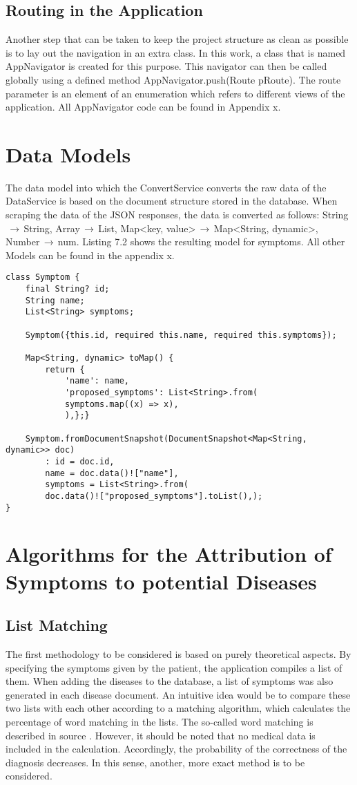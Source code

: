 \subsection{Routing in the Application}
Another step that can be taken to keep the project structure as clean as possible is to lay out the navigation in an extra class. In this work, a class that is named AppNavigator is created for this purpose. This navigator can then be called globally using a defined method AppNavigator.push(Route pRoute). The route parameter is an element of an enumeration which refers to different views of the application. All AppNavigator code can be found in Appendix x.
\section{Data Models}
The data model into which the ConvertService converts the raw data of the DataService is based on the document structure stored in the database. When scraping the data of the JSON responses, the data is converted as follows: String$\,\to\,$String, Array$\,\to\,$List, Map<key, value>$\,\to\,$Map<String, dynamic>, Number$\,\to\,$num. Listing 7.2 shows the resulting model for symptoms. All other Models can be found in the appendix x.
\scriptsize
\begin{lstlisting}[caption=Model for Symptoms]
class Symptom {
	final String? id;
	String name;
	List<String> symptoms;
	
	Symptom({this.id, required this.name, required this.symptoms});
	
	Map<String, dynamic> toMap() {
		return {
			'name': name,
			'proposed_symptoms': List<String>.from(
			symptoms.map((x) => x),
			),};}
	
	Symptom.fromDocumentSnapshot(DocumentSnapshot<Map<String, dynamic>> doc)
		: id = doc.id,
		name = doc.data()!["name"],
		symptoms = List<String>.from(
		doc.data()!["proposed_symptoms"].toList(),);	
}
\end{lstlisting}
\normalsize


\section{Algorithms for the Attribution of Symptoms to potential Diseases}
\subsection{List Matching}
The first methodology to be considered is based on purely theoretical aspects. By specifying the symptoms given by the patient, the application compiles a list of them. When adding the diseases to the database, a list of symptoms was also generated in each disease document. An intuitive idea would be to compare these two lists with each other according to a matching algorithm, which calculates the percentage of word matching in the lists. The so-called word matching is described in source \cite{.wordmatching}. However, it should be noted that no medical data is included in the calculation. Accordingly, the probability of the correctness of the diagnosis decreases. In this sense, another, more exact method is to be considered.

